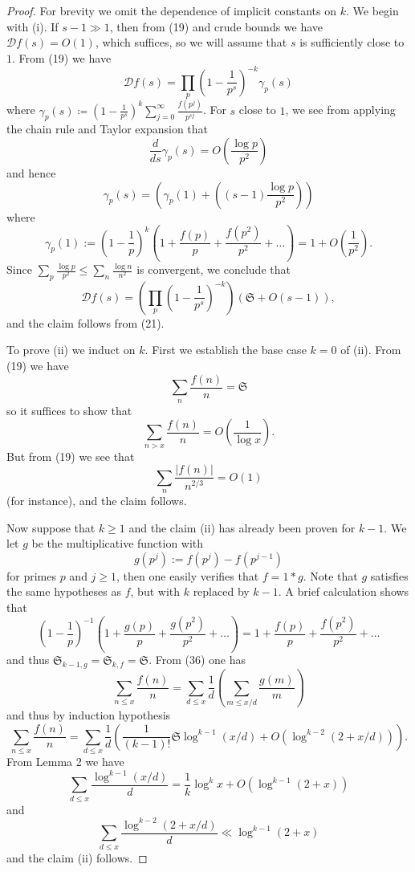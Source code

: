 \documentclass[10pt,reqno]{amsart}
\begin{document}
\begin{proof}
    For brevity we omit the dependence of implicit constants on $k$. We begin with (i). If $s-1 \gg 1$, then from (19) and crude bounds we have ${\mathcal D} f(s) = O(1)$, which suffices, so we will assume that $s$ is sufficiently close to $1$. From (19) we have
    \[  {\mathcal D} f(s) = \prod_p \left(1-\frac{1}{p^s} \right)^{-k} \gamma_p(s)\]
    where $\gamma_p(s) \coloneqq (1-\frac{1}{p^s})^{k} \sum_{j=0}^\infty \frac{f(p^j)}{p^{sj}}$. For $s$ close to $1$, we see from applying the chain rule and Taylor expansion that
    \[  \frac{d}{ds} \gamma_p(s) = O \left( \frac{\log p}{p^2} \right) \]
    and hence
    \[  \gamma_p(s) = \left(\gamma_p(1) +  \left( (s-1) \frac{\log p}{p^2} \right)\right)\]
    where
    \[  \gamma_p(1) := \left(1-\frac{1}{p} \right)^k \left(1 + \frac{f(p)}{p} + \frac{f(p^2)}{p^2} + \dots \right) = 1 + O\left(\frac{1}{p^2} \right).\]
    Since $\sum_p \frac{\log p}{p^2} \leq \sum_n \frac{\log n}{n^2}$ is convergent, we conclude that
    \[  {\mathcal D} f(s) = \left( \prod_p (1 - \frac{1}{p^s})^{-k} \right) ({\mathfrak S} + O( s-1 ) ),\]
    and the claim follows from (21).

    To prove (ii) we induct on $k$. First we establish the base case $k=0$ of (ii). From (19) we have
    \[  \sum_n \frac{f(n)}{n} = {\mathfrak S}\]
    so it suffices to show that
    \[  \sum_{n>x} \frac{f(n)}{n} = O( \frac{1}{\log x} ).\]
    But from (19) we see that
    \[  \sum_n \frac{|f(n)|}{n^{2/3}} = O(1)\]
    (for instance), and the claim follows.

    Now suppose that $k \geq 1$ and the claim (ii) has already been proven for $k-1$. We let $g$ be the multiplicative function with
    \[  g(p^j) := f(p^j) - f(p^{j-1})\]
    for primes $p$ and $j \geq 1$, then one easily verifies that $f = 1*g$. Note that $g$ satisfies the same hypotheses as $f$, but with $k$ replaced by $k-1$. A brief calculation shows that
    \[  (1 - \frac{1}{p})^{-1} (1 + \frac{g(p)}{p} + \frac{g(p^2)}{p^2} + \dots) = 1 + \frac{f(p)}{p} + \frac{f(p^2)}{p^2} + \dots\]
    and thus ${\mathfrak S}_{k-1,g} = {\mathfrak S}_{k,f} = {\mathfrak S}$. From (36) one has
    \[  \sum_{n \leq x} \frac{f(n)}{n} = \sum_{d \leq x} \frac{1}{d} \left(\sum_{m \leq x/d} \frac{g(m)}{m} \right) \]
    and thus by induction hypothesis
    \[  \sum_{n \leq x} \frac{f(n)}{n} = \sum_{d \leq x} \frac{1}{d} \left(\frac{1}{(k-1)!} {\mathfrak S} \log^{k-1}(x/d) + O( \log^{k-2}(2 + x/d) ) \right). \]
    From Lemma 2 we have
    \[  \sum_{d \leq x} \frac{\log^{k-1}(x/d)}{d} = \frac{1}{k} \log^k x + O( \log^{k-1}(2+x) )\]
    and
    \[  \sum_{d \leq x} \frac{\log^{k-2}(2+x/d)}{d} \ll \log^{k-1}(2+x)\]
    and the claim (ii) follows.


\end{proof}
\end{document}
